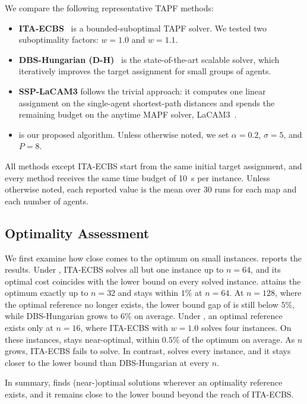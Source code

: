 We compare the following representative TAPF methods:
\begin{itemize}
\item \textbf{ITA-ECBS}~\cite{tang2024ita-ecbs} is a bounded-suboptimal TAPF solver.
We tested two suboptimality factors: $w=1.0$ and $w=1.1$. 
\item \textbf{DBS-Hungarian (D-H)}~\cite{kumagai2026alternating} is the state-of-the-art scalable solver, which iteratively improves the target assignment for small groups of agents.
\item \textbf{SSP-LaCAM3} follows the trivial approach: it computes one linear assignment on the single-agent shortest-path distances and spends the remaining budget on the anytime MAPF solver, LaCAM3~\cite{okumura2024lacamstar}.
\item \textbf{\planner} is our proposed algorithm.
Unless otherwise noted, we set $\alpha = 0.2$, $\sigma = 5$, and $P = 8$.
\end{itemize}
All methods except ITA-ECBS start from the same initial target assignment, and every method receives the same time budget of \SI{10}{\second} per instance.
Unless otherwise noted, each reported value is the mean over 30 runs for each map and each number of agents.

\subsection{Optimality Assessment}


We first examine how close \planner comes to the optimum on small instances.
 reports the results.
Under \scenEqdist, ITA-ECBS solves all but one instance up to $n=64$, and its optimal cost coincides with the lower bound on every solved instance.
\planner attains the optimum exactly up to $n=32$ and stays within $1\%$ at $n=64$.
At $n=128$, where the optimal reference no longer exists, the lower bound gap of \planner is still below $5\%$, while DBS-Hungarian grows to $6\%$ on average.
Under \scenHotspot, an optimal reference exists only at $n=16$, where ITA-ECBS with $w=1.0$ solves four instances.
On these instances, \planner stays near-optimal, within $0.5\%$ of the optimum on average.
As $n$ grows, ITA-ECBS fails to solve.
In contrast, \planner solves every instance, and it stays closer to the lower bound than DBS-Hungarian at every $n$. 

In summary, \planner finds (near-)optimal solutions wherever an optimality reference exists, and it remains close to the lower bound beyond the reach of ITA-ECBS.

